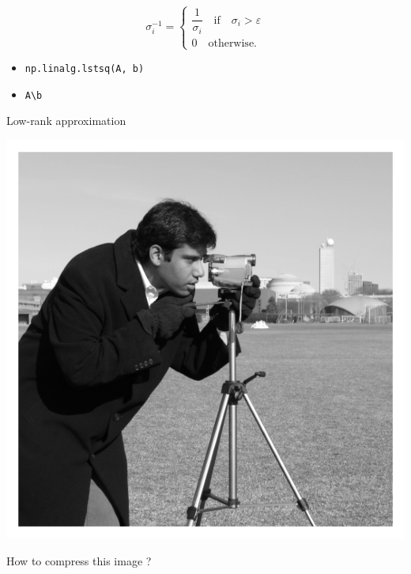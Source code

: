\documentclass[aspectratio=169, usenames, dvipsnames]{beamer}
\begin{document}
\begin{frame}[fragile]
  \vfill
  \begin{minipage}{.48\textwidth}
    \Large
    \[
    \sigma_i^{-1}
    =
    \begin{cases}
      \dfrac{1}{\sigma_i} \quad \text{if} \quad \sigma_i > \varepsilon \\
      0 \quad \text{otherwise.}
    \end{cases}
    \]
  \end{minipage}%
  \hfill
  \begin{minipage}{.48\textwidth}
    \begin{itemize}
      \item \verb+np.linalg.lstsq(A, b)+

      \bigskip

      \item \verb+A\b+
    \end{itemize}
  \end{minipage}
  \vfill
\end{frame}

\begin{frame}{Low-rank approximation}
  \centering

  \includegraphics[height=.75\textheight]{data/camera}

  How to compress this image ?
\end{frame}
\end{document}
